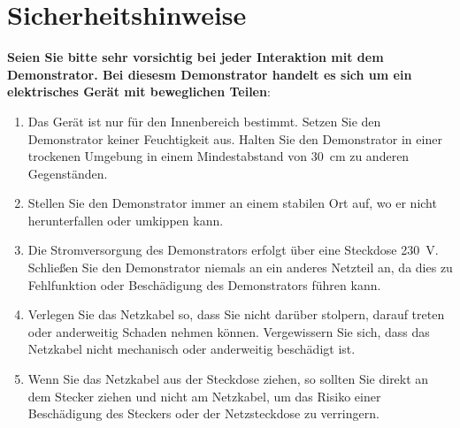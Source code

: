 %
%

\chapter{Sicherheitshinweise}


\textbf{Seien Sie bitte sehr vorsichtig bei jeder Interaktion mit dem Demonstrator. Bei diesesm Demonstrator handelt es sich um ein elektrisches Gerät mit beweglichen Teilen}:


	\begin{enumerate} \item Das Gerät ist nur für den Innenbereich bestimmt. Setzen Sie den Demonstrator keiner Feuchtigkeit aus. Halten Sie den Demonstrator in einer trockenen Umgebung in einem Mindestabstand von 30\ cm zu anderen Gegenständen.
	
				\item Stellen Sie den Demonstrator immer an einem stabilen Ort auf, wo er nicht herunterfallen oder umkippen kann.	
			
			 	\item Die Stromversorgung des Demonstrators erfolgt über eine Steckdose 230\ V. Schließen Sie den Demonstrator niemals an ein anderes Netzteil an, da dies zu Fehlfunktion oder Beschädigung des Demonstrators führen kann. 
				
				\item Verlegen Sie das Netzkabel so, dass Sie nicht darüber stolpern, darauf treten oder anderweitig Schaden nehmen können. Vergewissern Sie sich, dass das Netzkabel nicht mechanisch oder anderweitig beschädigt ist.
				 
				\item Wenn Sie das Netzkabel aus der Steckdose ziehen, so sollten Sie direkt an dem Stecker ziehen und nicht am Netzkabel, um das Risiko einer Beschädigung des Steckers oder der Netzsteckdose zu verringern.
				

\end{enumerate}
